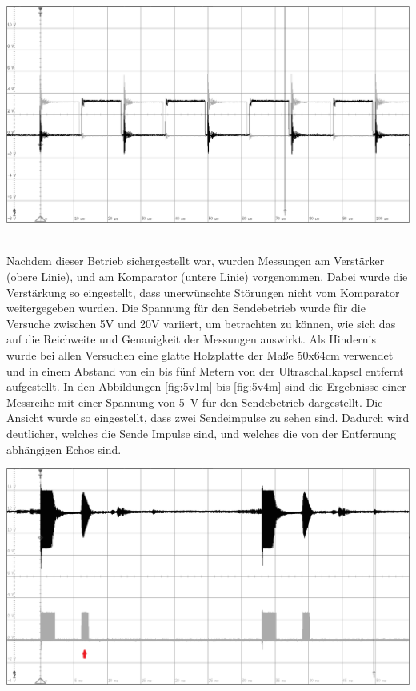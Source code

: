 \begin{minipage}{0.75\textwidth}
\includegraphics[width=1\textwidth%
]{Abbildungen/MessungenP2/Zwei_PWMs_von_der_CPU.PNG}
\label{fig:PWMs}
\end{minipage}\\
Nachdem dieser Betrieb sichergestellt war, wurden Messungen am Verstärker (obere Linie), und am Komparator (untere Linie) vorgenommen. Dabei wurde die Verstärkung so eingestellt, dass unerwünschte Störungen nicht vom Komparator weitergegeben wurden. Die Spannung für den Sendebetrieb wurde für die Versuche zwischen 5V und 20V variiert, um betrachten zu können, wie sich das auf die Reichweite und Genauigkeit der Messungen auswirkt. Als Hindernis wurde bei allen Versuchen eine glatte Holzplatte der Maße 50x64cm verwendet und in einem Abstand von ein bis fünf Metern von der Ultraschallkapsel entfernt aufgestellt. In den Abbildungen \ref{fig:5v1m} bis \ref{fig:5v4m} sind die Ergebnisse einer Messreihe mit einer Spannung von 5~V für den Sendebetrieb dargestellt. Die Ansicht wurde so eingestellt, dass zwei Sendeimpulse zu sehen sind. Dadurch wird deutlicher, welches die Sende Impulse sind, und welches die von der Entfernung abhängigen Echos sind.\\
\begin{minipage}{0.5\textwidth}
\includegraphics[width=1\textwidth%
]{Abbildungen/MessungenP2/5V/1mb.PNG}
\label{fig:5v1m}
\end{minipage}
